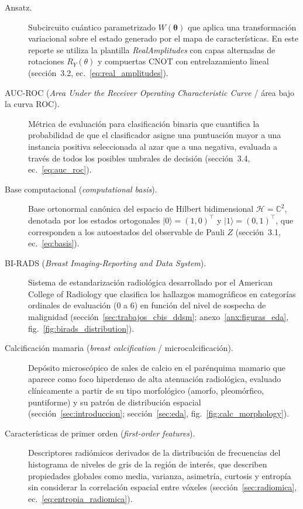 \begin{description}
  \item[Ansatz.] Subcircuito cuántico parametrizado $W(\boldsymbol{\theta})$ que aplica una transformación variacional sobre el estado generado por el mapa de características. En este reporte se utiliza la plantilla \textit{RealAmplitudes} con capas alternadas de rotaciones $R_Y(\theta)$ y compuertas CNOT con entrelazamiento lineal (sección~3.2, ec.~\ref{eq:real_amplitudes}).

  \item[AUC-ROC (\textit{Area Under the Receiver Operating Characteristic Curve} / área bajo la curva ROC).] Métrica de evaluación para clasificación binaria que cuantifica la probabilidad de que el clasificador asigne una puntuación mayor a una instancia positiva seleccionada al azar que a una negativa, evaluada a través de todos los posibles umbrales de decisión (sección~3.4, ec.~\ref{eq:auc_roc}).

  \item[Base computacional (\textit{computational basis}).] Base ortonormal canónica del espacio de Hilbert bidimensional $\mathcal{H} = \mathbb{C}^2$, denotada por los estados ortogonales $|0\rangle = (1, 0)^\top$ y $|1\rangle = (0, 1)^\top$, que corresponden a los autoestados del observable de Pauli $Z$ (sección~3.1, ec.~\ref{eq:basis}).

  \item[BI-RADS (\textit{Breast Imaging-Reporting and Data System}).] Sistema de estandarización radiológica desarrollado por el American College of Radiology que clasifica los hallazgos mamográficos en categorías ordinales de evaluación (0 a 6) en función del nivel de sospecha de malignidad (sección~\ref{sec:trabajos_cbis_ddsm}; anexo~\ref{anx:figuras_eda}, fig.~\ref{fig:birads_distribution}).

  \item[Calcificación mamaria (\textit{breast calcification} / microcalcificación).] Depósito microscópico de sales de calcio en el parénquima mamario que aparece como foco hiperdenso de alta atenuación radiológica, evaluado clínicamente a partir de su tipo morfológico (amorfo, pleomórfico, puntiforme) y su patrón de distribución espacial (sección~\ref{sec:introduccion}; sección~\ref{sec:eda}, fig.~\ref{fig:calc_morphology}).

  \item[Características de primer orden (\textit{first-order features}).] Descriptores radiómicos derivados de la distribución de frecuencias del histograma de niveles de gris de la región de interés, que describen propiedades globales como media, varianza, asimetría, curtosis y entropía sin considerar la correlación espacial entre vóxeles (sección~\ref{sec:radiomica}, ec.~\ref{eq:entropia_radiomica}).


\end{description}
